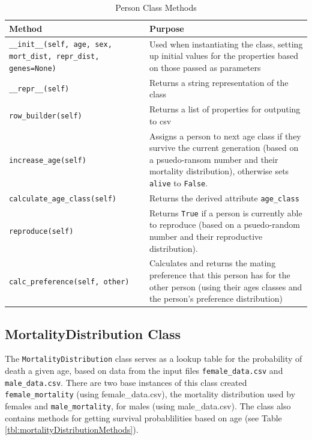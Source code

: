 \documentclass[authoryearcitations]{UoYCSproject}
\begin{document}
\begin{landscape}
\pagestyle{plain}
\begin{table}[h]
\caption{Person Class Methods}
\label{tbl:personMethods}
\begin{tabular}{m{8cm} m{8cm}}
\textbf{Method} & \textbf{Purpose} \\\hline
\texttt{\_\_init\_\_(self, age, sex, mort\_dist, repr\_dist, genes=None)} & Used when instantiating the class, setting up initial values for the properties based on those passed as parameters\\\hline
\texttt{\_\_repr\_\_(self)} & Returns a string representation of the class \\\hline
\texttt{row\_builder(self)} & Returns a list of properties for outputing to csv\\\hline
\texttt{increase\_age(self)} & Assigns a person to next age class if they survive the current generation (based on a psuedo-ransom number and their mortality distribution), otherwise sets \texttt{alive} to \texttt{False}.\\\hline
\texttt{calculate\_age\_class(self)} & Returns the derived attribute \texttt{age\_class} \\\hline
\texttt{reproduce(self)} & Returns \texttt{True} if a person is currently able to reproduce (based on a psuedo-random number and their reproductive distribution). \\\hline
\texttt{calc\_preference(self, other)} & Calculates and returns the mating preference that this person has for the other person (using their ages classes and the person's preference distribution) \\\hline
\end{tabular}
\end{table}
\end{landscape}

\newpage
\subsection{MortalityDistribution Class}
The \texttt{MortalityDistribution} class serves as a lookup table for the probability of death a given age, based on data from the input files \texttt{female\_data.csv} and \texttt{male\_data.csv}. There are two base instances of this class created \texttt{female\_mortality} (using female\_data.csv), the mortality distribution used by females and \texttt{male\_mortality}, for males (using male\_data.csv). The class also contains methods for getting survival probablilities based on age (see Table \ref{tbl:mortalityDistributionMethods}).
\end{document}
